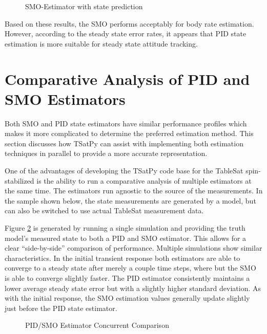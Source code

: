 \begin{figure}[H]
  \centerline{}
  \caption{SMO-Estimator with state prediction}
  \label{fig:SMOEstimatorwithstateprediction}
\end{figure}

Based on these results, the SMO performs acceptably for body rate estimation.  However, according to the steady state error rates, it appears that PID state estimation is more suitable for steady state attitude tracking.

\section{Comparative Analysis of PID and SMO Estimators}
\label{sec:ComparativeAnalysysofPIDandSMOEstimators}

Both SMO and PID state estimators have similar performance profiles which makes it more complicated to determine the preferred estimation method.  This section discusses how TSatPy can assist with implementing both estimation techniques in parallel to provide a more accurate representation.

One of the advantages of developing the TSatPy code base for the TableSat spin-stabilized is the ability to run a comparative analysis of multiple estimators at the same time.  The estimators run agnostic to the source of the measurements.  In the sample shown below, the state measurements are generated by a model, but can also be switched to use actual TableSat measurement data.

Figure \ref{fig:PIDSMOEstimatorConcurrentComparison} is generated by running a single simulation and providing the truth model's measured state to both a PID and SMO estimator.  This allows for a clear ``side-by-side'' comparison of performance.  Multiple simulations show similar characteristics.  In the initial transient response both estimators are able to converge to a steady state after merely a couple time steps, where but the SMO is able to converge slightly faster.  The PID estimator consistently maintains a lower average steady state error but with a slightly higher standard deviation.  As with the initial response, the SMO estimation values generally update slightly just before the PID state estimator.

\begin{figure}[H]
  \centerline{}
  \caption{PID/SMO Estimator Concurrent Comparison}
  \label{fig:PIDSMOEstimatorConcurrentComparison}
\end{figure}

